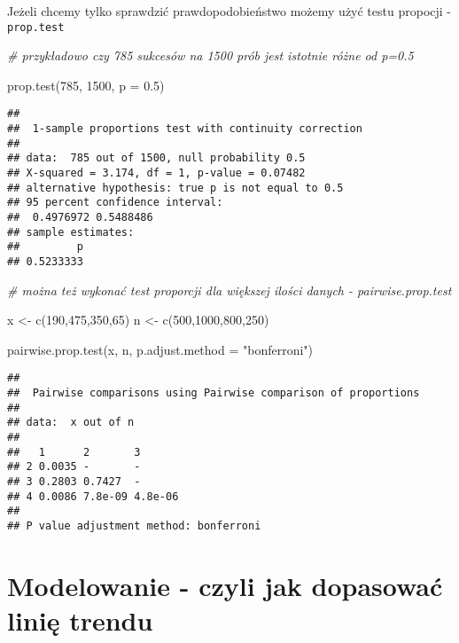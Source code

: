 \documentclass[
]{book}
\newenvironment{Shaded}{\begin{snugshade}}{\end{snugshade}}
\newcommand{\AttributeTok}[1]{\textcolor[rgb]{0.77,0.63,0.00}{#1}}
\newcommand{\CommentTok}[1]{\textcolor[rgb]{0.56,0.35,0.01}{\textit{#1}}}
\newcommand{\DecValTok}[1]{\textcolor[rgb]{0.00,0.00,0.81}{#1}}
\newcommand{\FloatTok}[1]{\textcolor[rgb]{0.00,0.00,0.81}{#1}}
\newcommand{\FunctionTok}[1]{\textcolor[rgb]{0.00,0.00,0.00}{#1}}
\newcommand{\NormalTok}[1]{#1}
\newcommand{\OtherTok}[1]{\textcolor[rgb]{0.56,0.35,0.01}{#1}}
\newcommand{\StringTok}[1]{\textcolor[rgb]{0.31,0.60,0.02}{#1}}
\begin{document}
Jeżeli chcemy tylko sprawdzić prawdopodobieństwo możemy użyć testu propocji - \texttt{prop.test}

\begin{Shaded}
\begin{Highlighting}[]
\CommentTok{\# przykładowo czy 785 sukcesów na 1500 prób jest istotnie różne od p=0.5}

\FunctionTok{prop.test}\NormalTok{(}\DecValTok{785}\NormalTok{, }\DecValTok{1500}\NormalTok{, }\AttributeTok{p =} \FloatTok{0.5}\NormalTok{)}
\end{Highlighting}
\end{Shaded}

\begin{verbatim}
## 
##  1-sample proportions test with continuity correction
## 
## data:  785 out of 1500, null probability 0.5
## X-squared = 3.174, df = 1, p-value = 0.07482
## alternative hypothesis: true p is not equal to 0.5
## 95 percent confidence interval:
##  0.4976972 0.5488486
## sample estimates:
##         p 
## 0.5233333
\end{verbatim}

\begin{Shaded}
\begin{Highlighting}[]
\CommentTok{\# można też wykonać test proporcji dla większej ilości danych {-} pairwise.prop.test}

\NormalTok{x }\OtherTok{\textless{}{-}} \FunctionTok{c}\NormalTok{(}\DecValTok{190}\NormalTok{,}\DecValTok{475}\NormalTok{,}\DecValTok{350}\NormalTok{,}\DecValTok{65}\NormalTok{)}
\NormalTok{n }\OtherTok{\textless{}{-}} \FunctionTok{c}\NormalTok{(}\DecValTok{500}\NormalTok{,}\DecValTok{1000}\NormalTok{,}\DecValTok{800}\NormalTok{,}\DecValTok{250}\NormalTok{)}

\FunctionTok{pairwise.prop.test}\NormalTok{(x, n, }\AttributeTok{p.adjust.method =} \StringTok{"bonferroni"}\NormalTok{)}
\end{Highlighting}
\end{Shaded}

\begin{verbatim}
## 
##  Pairwise comparisons using Pairwise comparison of proportions 
## 
## data:  x out of n 
## 
##   1      2       3      
## 2 0.0035 -       -      
## 3 0.2803 0.7427  -      
## 4 0.0086 7.8e-09 4.8e-06
## 
## P value adjustment method: bonferroni
\end{verbatim}

\hypertarget{modelowanie---czyli-jak-dopasowaux107-liniux119-trendu}{%
\section{Modelowanie - czyli jak dopasować linię trendu}\label{modelowanie---czyli-jak-dopasowaux107-liniux119-trendu}}
\end{document}
